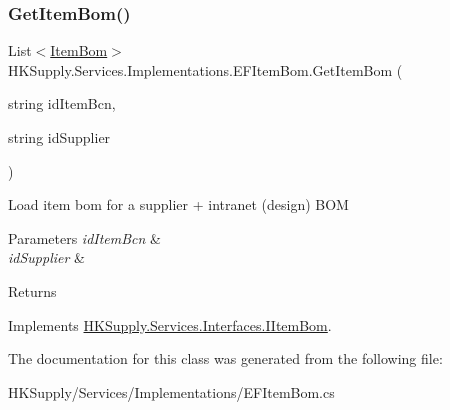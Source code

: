 \mbox{\label{class_h_k_supply_1_1_services_1_1_implementations_1_1_e_f_item_bom_a11dbd453a2f553e3e00e163a846397e6}} 
\subsubsection{\texorpdfstring{Get\+Item\+Bom()}{GetItemBom()}}
{\footnotesize\ttfamily List$<$\mbox{\hyperlink{class_h_k_supply_1_1_models_1_1_item_bom}{Item\+Bom}}$>$ H\+K\+Supply.\+Services.\+Implementations.\+E\+F\+Item\+Bom.\+Get\+Item\+Bom (\begin{DoxyParamCaption}\item[{string}]{id\+Item\+Bcn,  }\item[{string}]{id\+Supplier }\end{DoxyParamCaption})}



Load item bom for a supplier + intranet (design) B\+OM 


\begin{DoxyParams}{Parameters}
{\em id\+Item\+Bcn} & \\
\hline
{\em id\+Supplier} & \\
\hline
\end{DoxyParams}
\begin{DoxyReturn}{Returns}

\end{DoxyReturn}


Implements \mbox{\hyperlink{interface_h_k_supply_1_1_services_1_1_interfaces_1_1_i_item_bom}{H\+K\+Supply.\+Services.\+Interfaces.\+I\+Item\+Bom}}.



The documentation for this class was generated from the following file\+:\begin{DoxyCompactItemize}
\item 
H\+K\+Supply/\+Services/\+Implementations/E\+F\+Item\+Bom.\+cs\end{DoxyCompactItemize}
